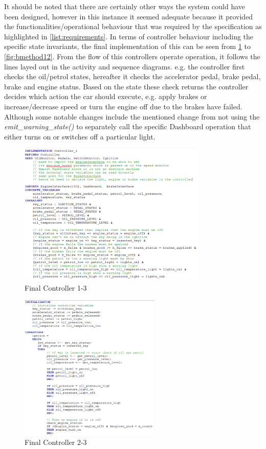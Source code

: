 \documentclass[12pt]{article}
\begin{document}
It should be noted that there are certainly other ways the system could have been designed, however in this instance it seemed adequate because it provided the functionalities/operational behaviour that was required by the specification as highlighted in \ref{list:requirements}. In terms of  controller behaviour including the specific state invariants, the final implementation of this can be seen from \ref{fig:bmethod10} to \ref{fig:bmethod12}. From the flow of this controllers operate operation, it follows the lines layed out in the activity and sequence diagrams. e.g. the controller first checks the oil/petrol states, hereafter it checks the accelerator pedal, brake pedal, brake and engine status. Based on the state these check returns the controller decides which action the car should execute, e.g. apply brakes or increase/decrease speed or turn the engine off due to the brakes have failed. Although some notable changes include the mentioned change from not using the \textit{emit\_warning\_state()} to separately call the specific Dashboard operation that either turns on or switches off a particular light.

\begin{figure}[H]
	\centering
	\includegraphics[width=0.8\textwidth]{new_controller_v1}
	\caption{Final Controller 1-3}
	\label{fig:bmethod10}
\end{figure}

\begin{figure}[H]
	\centering
	\includegraphics[width=0.6\textwidth]{new_controller_v2}
	\caption{Final Controller 2-3}
	\label{fig:bmethod11}
\end{figure}
\end{document}
